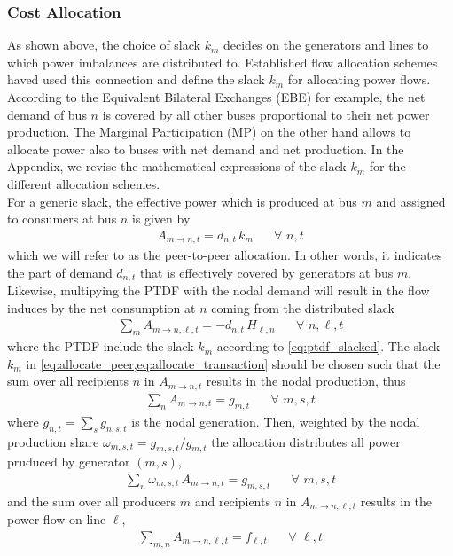 \documentclass[11pt]{article}
\newcommand{\generation}[1][n]{g_{#1,s,t}}
\newcommand{\generationshare}[1][n]{\omega_{#1,s,t}}
\newcommand{\generationnodal}[1][n]{g_{#1,t}}
\newcommand{\demandnodal}[1][n]{d_{#1,t}}
\newcommand{\ptdf}[1][n]{H_{\ell,#1}}
\newcommand{\slack}[1][n]{k_{#1}}
\newcommand{\flow}{f_{\ell,t}}
\newcommand{\allocatePeer}[1][m \rightarrow n]{A_{#1,t}}
\newcommand{\allocateTransaction}[1][m \rightarrow n]{A_{#1,\ell,t}}
\newcommand{\Forall}[1]{\hspace{20pt} \forall \,\, #1 }
\begin{document}
\subsubsection*{Cost Allocation}

As shown above, the choice of slack $\slack[m]$ decides on the generators and lines to which power imbalances are distributed to. Established flow allocation schemes haved used this connection and define the slack $\slack[m]$ for allocating power flows. According to the Equivalent Bilateral Exchanges (EBE) for example, the net demand of bus $n$ is covered by all other buses proportional to their net power production. The Marginal Participation (MP) on the other hand allows to allocate power also to buses with net demand and net production. In the Appendix, we revise the mathematical expressions of the slack $\slack[m]$ for the different allocation schemes. \\  

For a generic slack, the effective power which is produced at bus $m$ and assigned to consumers at bus $n$ is given by
\begin{align}
 \allocatePeer = \demandnodal \, \slack[m]   \Forall{n,t}
 \label{eq:allocate_peer}
\end{align}
which we will refer to as the peer-to-peer allocation. In other words, it indicates the part of demand $\demandnodal$ that is effectively covered by generators at bus $m$. Likewise, multipying the PTDF with the nodal demand will result in the flow induces by the net consumption at $n$ coming from the distributed slack 
\begin{align}
 \sum_m \allocateTransaction = - \demandnodal  \, \ptdf \Forall{n,\ell,t}  
 \label{eq:allocate_transaction}
\end{align}
where the PTDF include the slack $\slack[m]$ according to \cref{eq:ptdf_slacked}. The slack $\slack[m]$ in \cref{eq:allocate_peer,eq:allocate_transaction} should be chosen such that the sum over all recipients $n$ in $\allocatePeer$ results in the nodal production, thus
\begin{align}
 \sum_n \allocatePeer = \generationnodal[m] \Forall{m,s,t}
 \label{eq:generator_sum}
\end{align}
where $\generationnodal = \sum_s \generation$ is the nodal generation.
Then, weighted by the nodal production share $\generationshare[m] = \generation[m]/\generationnodal[m]$ the allocation distributes all power pruduced by generator $(m,s)$,
\begin{align}
  \sum_n \generationshare[m] \, \allocatePeer = \generation[m] \Forall{m,s,t}
  \label{eq:recipients_sum}
\end{align}
and the sum over all producers $m$ and recipients $n$ in $\allocateTransaction$ results in the power flow on line $\ell$,
\begin{align}
 \sum_{m,n} \allocateTransaction = \flow \Forall{\ell,t}
 \label{eq:transaction_sum}
\end{align}
\\
\end{document}
